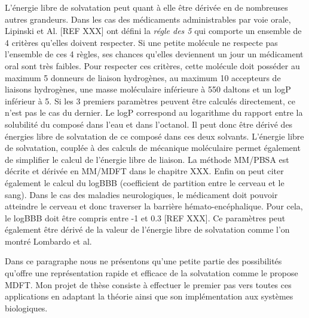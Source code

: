 L'énergie libre de solvatation peut quant à elle être dérivée en de nombreuses autres grandeurs. Dans les cas des médicaments administrables par voie orale, Lipinski et Al. [REF XXX] ont défini la \textit{régle des 5} qui comporte un ensemble de 4 critères qu'elles doivent respecter. Si une petite molécule ne respecte pas l'ensemble de ces 4 règles, ses chances qu'elles deviennent un jour un médicament oral sont très faibles. Pour respecter ces critères, cette molécule doit posséder au maximum 5 donneurs de liaison hydrogènes, au maximum 10 accepteurs de liaisons hydrogènes, une masse moléculaire inférieure à 550 daltons et un logP inférieur à 5. Si les 3 premiers paramètres peuvent être calculés directement, ce n'est pas le cas du dernier. Le logP correspond au logarithme du rapport entre la solubilité du composé dans l'eau et dans l'octanol. Il peut donc être dérivé des énergies libre de solvatation de ce composé dans ces deux solvants. L'énergie libre de solvatation, couplée à des calculs de mécanique moléculaire permet également de simplifier le calcul de l'énergie libre de liaison. La méthode MM/PBSA\cite{Genheden__MMPBSA_2015} est décrite et dérivée en MM/MDFT dans le chapitre XXX. Enfin on peut citer également le calcul du logBBB (coefficient de partition entre le cerveau et le sang). Dans le cas des maladies neurologiques, le médicament doit pouvoir atteindre le cerveau et donc traverser la barrière hémato-encéphalique. Pour cela, le logBBB doit être compris entre -1 et 0.3 [REF XXX]. Ce paramètres peut également être dérivé de la valeur de l'énergie libre de solvatation comme l'on montré Lombardo et al\cite{Lombardo_computation_1996}.

Dans ce paragraphe nous ne présentons qu'une petite partie des possibilités qu'offre une représentation rapide et efficace de la solvatation comme le propose MDFT. Mon projet de thèse consiste à effectuer le premier pas vers toutes ces applications en adaptant la théorie ainsi que son implémentation aux systèmes biologiques.




\vspace{8\baselineskip}




